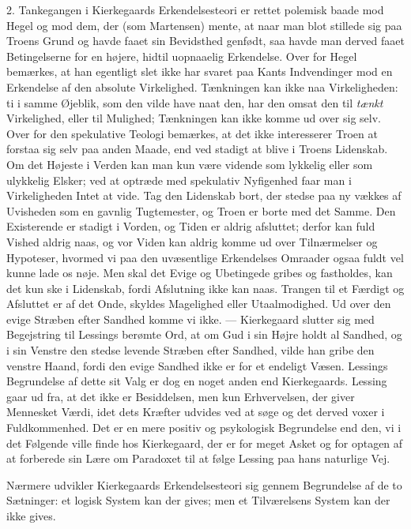 \documentclass[12pt,a4paper,openany]{book}
\newcommand{\opage}[1]{\marginnote{\footnotesize\textit{[#1]}}}
\begin{document}
2. Tankegangen i Kierkegaards Erkendelsesteori er
rettet polemisk baade mod Hegel og mod dem, der (som
Martensen) mente, at naar man blot stillede sig paa
Troens Grund og havde faaet sin Bevidsthed genfødt,
saa havde man derved faaet Betingelserne for en højere,
hidtil uopnaaelig Erkendelse. Over for Hegel bemærkes,
at han egentligt slet ikke har svaret paa Kants Indvendinger
mod en Erkendelse af den absolute Virkelighed.
Tænkningen kan ikke naa Virkeligheden: ti i samme
Øjeblik, som den vilde have naat den, har den omsat
den til \textit{tænkt} Virkelighed, eller til Mulighed; Tænkningen
kan ikke komme ud over sig selv. Over for den spekulative
Teologi bemærkes, at det ikke interesserer Troen
at forstaa sig selv paa anden Maade, end ved stadigt at
blive i Troens Lidenskab. Om det Højeste i Verden kan
man kun være vidende som lykkelig eller som ulykkelig
Elsker; ved at optræde med spekulativ Nyfigenhed faar
man i Virkeligheden Intet at vide. Tag den Lidenskab
bort, der stedse paa ny vækkes af Uvisheden som en
gavnlig Tugtemester, og Troen er borte med det Samme.
Den Existerende er stadigt i Vorden, og Tiden er aldrig
\opage{60}afsluttet; derfor kan fuld Vished aldrig naas, og vor
Viden kan aldrig komme ud over Tilnærmelser og Hypoteser,
hvormed vi paa den uvæsentlige Erkendelses Omraader
ogsaa fuldt vel kunne lade os nøje. Men skal
det Evige og Ubetingede gribes og fastholdes, kan det
kun ske i Lidenskab, fordi Afslutning ikke kan naas.
Trangen til et Færdigt og Afsluttet er af det Onde,
skyldes Magelighed eller Utaalmodighed. Ud over den
evige Stræben efter Sandhed komme vi ikke. --- Kierkegaard
slutter sig med Begejstring til Lessings berømte
Ord, at om Gud i sin Højre holdt al Sandhed, og i sin
Venstre den stedse levende Stræben efter Sandhed, vilde
han gribe den venstre Haand, fordi den evige Sandhed
ikke er for et endeligt Væsen. Lessings Begrundelse af
dette sit Valg er dog en noget anden end Kierkegaards.
Lessing gaar ud fra, at det ikke er Besiddelsen, men
kun Erhvervelsen, der giver Mennesket Værdi, idet dets
Kræfter udvides ved at søge og det derved voxer i Fuldkommenhed.
Det er en mere positiv og psykologisk Begrundelse
end den, vi i det Følgende ville finde hos
Kierkegaard, der er for meget Asket og for optagen af
at forberede sin Lære om Paradoxet til at følge Lessing
paa hans naturlige Vej.

Nærmere udvikler Kierkegaards Erkendelsesteori sig
gennem Begrundelse af de to Sætninger: et logisk System
kan der gives; men et Tilværelsens System kan der ikke
gives.
\end{document}
